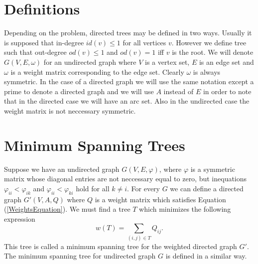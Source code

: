 \documentclass[10pt]{article}
\begin{document}
\section{Definitions}
Depending on the problem, directed trees may be defined in two ways. 
Usually it is supposed that in-degree $id(v) \leq 1$ for all vertices $v$.
However we define tree such that out-degree $od(v) \leq 1$ and $od(v) = 1$
iff $v$ is the root. We will denote $G(V,E,\omega)$ for an undirected graph
where $V$ is a vertex set, $E$ is an edge set and $\omega$ is a weight matrix
corresponding to the edge set. Clearly $\omega$ is always symmetric. In the case
of a directed graph we will use the same notation except a prime to denote
a directed graph and we will use $A$ instead of $E$ in order to note that in
the directed case we will have an arc set. Also in the undirected case the
weight matrix is not neccessary symmetric.   

\section{Minimum Spanning Trees}
Suppose we have an undirected graph $G(V,E,\varphi)$, where $\varphi$ is
a symmetric matrix whose diagonal entries are not neccessary equal to zero,
but inequations $\varphi_{ii} < \varphi_{ik}$ and $\varphi_{ii} < \varphi_{ki}$
hold for all $k \neq i$.  For every $G$ we can define a directed graph
$G'(V,A,Q)$ where $Q$ is a weight matrix which satisfies Equation
(\ref{WeightsEquation}). We must find a tree $T$ which minimizes the following 
expression
\begin{equation}\label{TreeWeight}
	w(T) = \sum_{(i,j) \in T} Q_{ij}.
\end{equation}
This tree is called a minimum spanning tree for the weighted directed graph
$G'$. The minimum spanning tree for undirected graph $G$ is defined in a similar
way.
\end{document}
